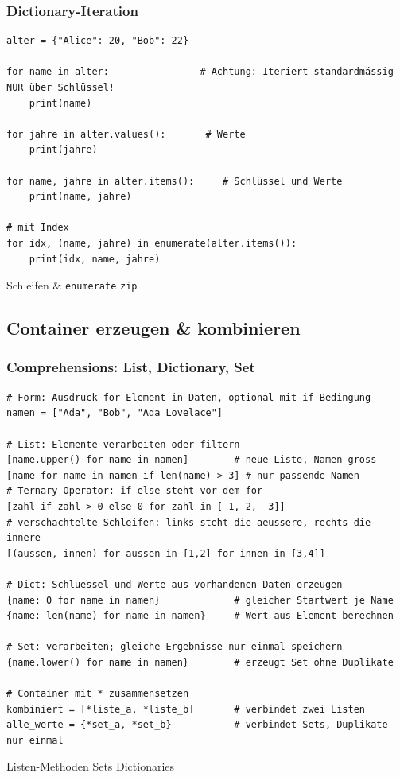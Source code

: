 \subsubsection{Dictionary-Iteration}\label{sec:01-iteration-über-ein-dictionary}
\begin{codebox}
\begin{lstlisting}[style=CodeExpert]
alter = {"Alice": 20, "Bob": 22}

for name in alter:                # Achtung: Iteriert standardmässig NUR über Schlüssel!
    print(name)

for jahre in alter.values():       # Werte
    print(jahre)

for name, jahre in alter.items():     # Schlüssel und Werte
    print(name, jahre)

# mit Index
for idx, (name, jahre) in enumerate(alter.items()):
    print(idx, name, jahre)
\end{lstlisting}
Schleifen \& \texttt{enumerate} \enspace
\texttt{zip} 
\end{codebox}

\subsection{Container erzeugen \& kombinieren}\label{sec:01-container-erzeugen}
\subsubsection{Comprehensions: List, Dictionary, Set}\label{sec:01-list-comprehension}
\begin{codebox}
\begin{lstlisting}[style=CodeExpert]
# Form: Ausdruck for Element in Daten, optional mit if Bedingung
namen = ["Ada", "Bob", "Ada Lovelace"]

# List: Elemente verarbeiten oder filtern
[name.upper() for name in namen]        # neue Liste, Namen gross
[name for name in namen if len(name) > 3] # nur passende Namen
# Ternary Operator: if-else steht vor dem for
[zahl if zahl > 0 else 0 for zahl in [-1, 2, -3]]
# verschachtelte Schleifen: links steht die aeussere, rechts die innere
[(aussen, innen) for aussen in [1,2] for innen in [3,4]]

# Dict: Schluessel und Werte aus vorhandenen Daten erzeugen
{name: 0 for name in namen}             # gleicher Startwert je Name
{name: len(name) for name in namen}     # Wert aus Element berechnen

# Set: verarbeiten; gleiche Ergebnisse nur einmal speichern
{name.lower() for name in namen}        # erzeugt Set ohne Duplikate

# Container mit * zusammensetzen
kombiniert = [*liste_a, *liste_b]       # verbindet zwei Listen
alle_werte = {*set_a, *set_b}           # verbindet Sets, Duplikate nur einmal
\end{lstlisting}
Listen-Methoden \enspace
Sets \enspace
Dictionaries 
\end{codebox}

